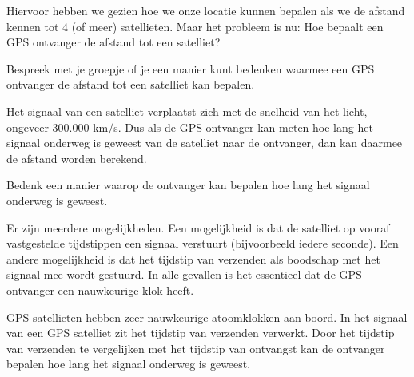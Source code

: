 Hiervoor hebben we gezien hoe we onze locatie kunnen bepalen als we de afstand kennen tot 4 (of meer) satellieten. Maar het probleem is nu: Hoe bepaalt een GPS ontvanger de afstand tot een satelliet?

\begin{opgave}[\discussie]
	Bespreek met je groepje of je een manier kunt bedenken waarmee een GPS ontvanger de afstand tot een satelliet kan bepalen.
\end{opgave}

Het signaal van een satelliet verplaatst zich met de snelheid van het licht, ongeveer 300.000 km/s. Dus als de GPS ontvanger kan meten hoe lang het signaal onderweg is geweest van de satelliet naar de ontvanger, dan kan daarmee de afstand worden berekend.

\begin{opgave}
	Bedenk een manier waarop de ontvanger kan bepalen hoe lang het signaal onderweg is geweest.
	\begin{antwoord}
		Er zijn meerdere mogelijkheden. Een mogelijkheid is dat de satelliet op vooraf vastgestelde tijdstippen een signaal verstuurt (bijvoorbeeld iedere seconde). Een andere mogelijkheid is dat het tijdstip van verzenden als boodschap met het signaal mee wordt gestuurd. In alle gevallen is het essentieel dat de GPS ontvanger een nauwkeurige klok heeft.
	\end{antwoord}
\end{opgave}

GPS satellieten hebben zeer nauwkeurige atoomklokken aan boord. In het signaal van een GPS satelliet zit het tijdstip van verzenden verwerkt. Door het tijdstip van verzenden te vergelijken met het tijdstip van ontvangst kan de ontvanger bepalen hoe lang het signaal onderweg is geweest.

